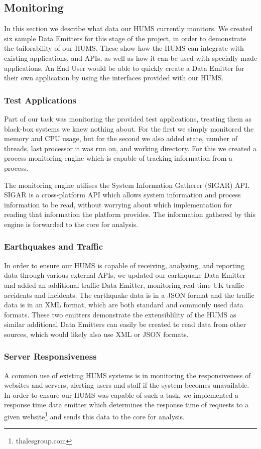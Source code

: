 \documentclass[10pt,a4paper]{article}
\begin{document}
\subsection{Monitoring}
\label{sec:monitor}
In this section we describe what data our HUMS currently monitors. We created six sample Data Emitters for this stage of the project, in order to demonstrate the tailorability of our HUMS. These show how the HUMS can integrate with existing applications, and APIs, as well as how it can be used with specially made applications. An End User would be able to quickly create a Data Emitter for their own application by using the interfaces provided with our HUMS.

\subsubsection{Test Applications} \label{subsec:tapp}
Part of our task was monitoring the provided test applications, treating them as black-box systems we knew nothing about. For the first we simply monitored the memory and CPU usage, but for the second we also added state, number of threads, last processor it was run on, and working directory. For this we created a process monitoring engine which is capable of tracking information from a process.

The monitoring engine utilises the System Information Gatherer (SIGAR) API. SIGAR is a cross-platform API which allows system information and process information to be read, without worrying about which implementation for reading that information the platform provides. The information gathered by this engine is forwarded to the core for analysis.

\subsubsection{Earthquakes and Traffic}
In order to ensure our HUMS is capable of receiving, analysing, and reporting data through various external APIs, we updated our earthquake Data Emitter and added an additional traffic Data Emitter, monitoring real time UK traffic accidents and incidents. The earthquake data is in a JSON format and the traffic data is in an XML format, which are both standard and commonly used data formats. These two emitters demonstrate the extensiblility of the HUMS as similar additional Data Emitters can easily be created to read data from other sources, which would likely also use XML or JSON formats.

\subsubsection{Server Responsiveness}
A common use of existing HUMS systems is in monitoring the responsiveness of websites and servers, alerting users and staff if the system becomes unavailable. In order to ensure our HUMS was capable of such a task, we implemented a response time data emitter which determines the response time of requests to a given website\footnote{thalesgroup.com} and sends this data to the core for analysis.
\end{document}
